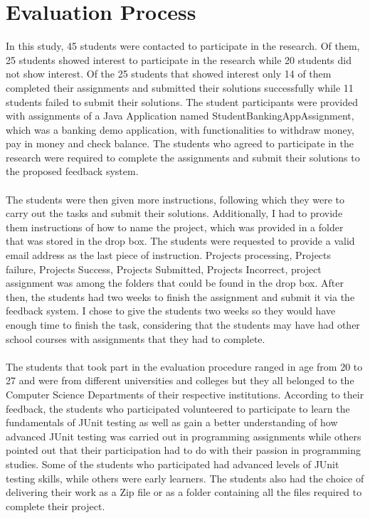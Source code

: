 \section{ Evaluation Process}
In this study, 45 students were contacted to participate in the research. Of them, 25 students showed interest to participate in the research while 20 students did not show interest. Of the 25 students that showed interest only 14 of them completed their assignments and submitted their solutions successfully while 11 students failed to submit their solutions. The student participants were provided with assignments of a Java Application named StudentBankingAppAssignment, which was a banking demo application, with functionalities to withdraw money, pay in money and check balance. The students who agreed to participate in the research were required to complete the assignments and submit their solutions to the proposed feedback system. \\
\\
The students were then given more instructions, following which they were to carry out the tasks and submit their solutions. Additionally, I had to provide them instructions of how to name the project, which was provided in a folder that was stored in the drop box. The students were requested to provide a valid email address as the last piece of instruction. Projects processing, Projects failure, Projects Success, Projects Submitted, Projects Incorrect, project assignment was among the folders that could be found in the drop box. After then, the students had two weeks to finish the assignment and submit it via the feedback system. I chose to give the students two weeks so they would have enough time to finish the task, considering that the students may have had other school courses with assignments that they had to complete. \\
\\ 
The students that took part in the evaluation procedure ranged in age from 20 to 27 and were from different universities and colleges but they all belonged to the Computer Science Departments of their respective institutions. According to their feedback, the students who participated volunteered to participate to learn the fundamentals of JUnit testing as well as gain a better understanding of how advanced JUnit testing was carried out in programming assignments while others pointed out that their participation had to do with their passion in programming studies. Some of the students who participated had advanced levels of JUnit testing skills, while others were early learners. The students also had the choice of delivering their work as a Zip file or as a folder containing all the files required to complete their project.\\
